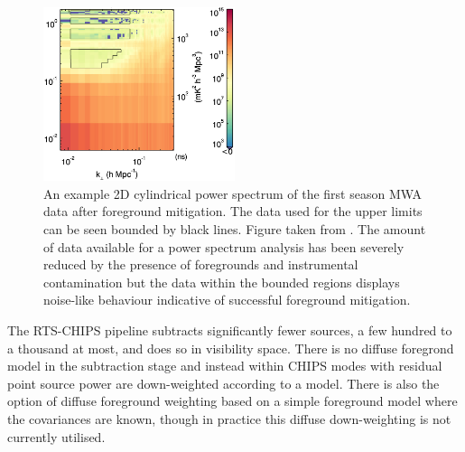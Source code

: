 \begin{figure}
\begin{center}
    \includegraphics[width=0.5\textwidth]{Images/apjaa3b64f13_hr.jpg}
\end{center}
    \caption{An example 2D cylindrical power spectrum of the first season MWA data after foreground mitigation. The data used for the upper limits can be seen bounded by black lines. Figure taken from \citet{Beardsley2016ApJ...833..102B}. The amount of data available for a power spectrum analysis has been severely reduced by the presence of foregrounds and instrumental contamination but the data within the bounded regions displays noise-like behaviour indicative of successful foreground mitigation.}
    \label{fig:masks}
\end{figure}

The RTS-CHIPS pipeline subtracts significantly fewer sources, a few hundred to a thousand at most, and does so in visibility space. There is no diffuse foregrond model in the subtraction stage and instead within CHIPS modes with residual point source power are down-weighted according to a model. There is also the option of diffuse foreground weighting based on a simple foreground model where the covariances are known, though in practice this diffuse down-weighting is not currently utilised.

